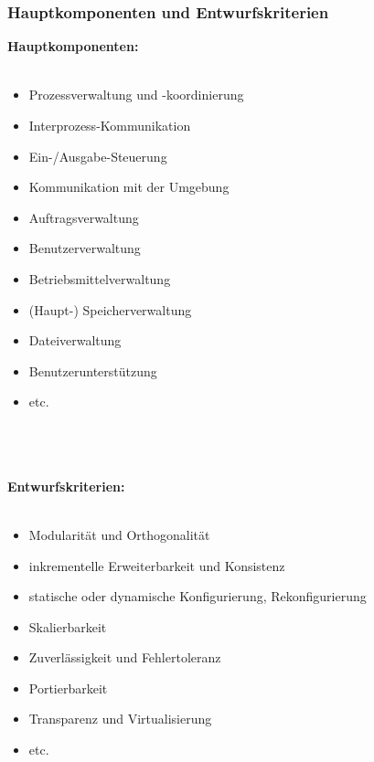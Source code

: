 \subsubsection{Hauptkomponenten und Entwurfskriterien}
\textbf{Hauptkomponenten:}\\ \\
\begin{minipage}{0.5\textwidth}
    \begin{itemize}
        \item Prozessverwaltung und -koordinierung 
        \item Interprozess-Kommunikation
        \item Ein-/Ausgabe-Steuerung
        \item Kommunikation mit der Umgebung
        \item Auftragsverwaltung
        \item Benutzerverwaltung
    \end{itemize}
\end{minipage}
\hfill
\begin{minipage}{0.45\textwidth}
    \begin{itemize}
        \item Betriebsmittelverwaltung
        \item (Haupt-) Speicherverwaltung
        \item Dateiverwaltung
        \item Benutzerunterstützung
        \item etc.
    \end{itemize}
\end{minipage} \\ \\ \\
\textbf{Entwurfskriterien:}\\ \\
\begin{minipage}{0.5\textwidth}
    \begin{itemize}
        \item Modularität und Orthogonalität
        \item inkrementelle Erweiterbarkeit und Konsistenz
        \item statische oder dynamische Konfigurierung, Rekonfigurierung
        \item Skalierbarkeit
    \end{itemize}
\end{minipage}
\hfill    
\begin{minipage}{0.45\textwidth}
    \begin{itemize}
        \item Zuverlässigkeit und Fehlertoleranz
        \item Portierbarkeit
        \item Transparenz und Virtualisierung
        \item etc.
    \end{itemize}
\end{minipage}

